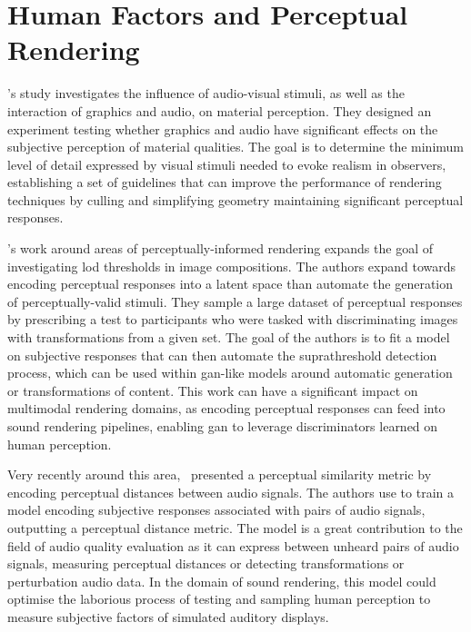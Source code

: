 \section{Human Factors and Perceptual Rendering}\label{sec:perceptual-rendering}
\cite{bonneel2010bimodal}'s study investigates the influence of audio-visual stimuli, as well as the interaction of graphics and audio, on material perception. They designed an experiment testing whether graphics and audio have significant effects on the subjective perception of material qualities. The goal is to determine the minimum level of detail expressed by visual stimuli needed to evoke realism in observers, establishing a set of guidelines that can improve the performance of rendering techniques by culling and simplifying geometry maintaining significant perceptual responses.

\cite{Dolhasz_2020_CVPR}'s work around areas of perceptually-informed rendering expands the goal of investigating \acrshort{lod} thresholds in image compositions. The authors expand towards encoding perceptual responses into a latent space than automate the generation of perceptually-valid stimuli. They sample a large dataset of perceptual responses by prescribing a test to participants who were tasked with discriminating images with transformations from a given set. The goal of the authors is to fit a model on subjective responses that can then automate the suprathreshold detection process, which can be used within \acrshort{gan}-like models around automatic generation or transformations of content. This work can have a significant impact on multimodal rendering domains, as encoding perceptual responses can feed into sound rendering pipelines, enabling \acrshort{gan} to leverage discriminators learned on human perception.\par
Very recently around this area,~\cite{manocha2021cdpam} presented a perceptual similarity metric by encoding perceptual distances between audio signals. The authors use  to train a model encoding subjective responses associated with pairs of audio signals, outputting a perceptual distance metric. The model is a great contribution to the field of audio quality evaluation as it can express  between unheard pairs of audio signals, measuring perceptual distances or detecting transformations or perturbation audio data. In the domain of sound rendering, this model could optimise the laborious process of testing and sampling human perception to measure subjective factors of simulated auditory displays.\par

